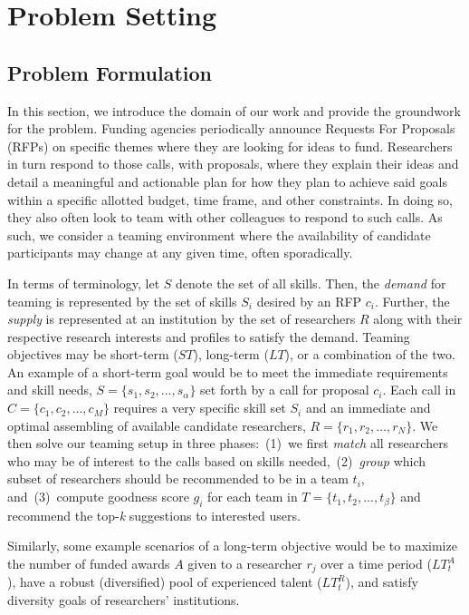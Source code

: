 \section{Problem Setting}

\subsection{Problem Formulation}

In this section, we introduce the domain of our work and provide the groundwork for the problem. Funding agencies periodically announce Requests For Proposals (RFPs) on specific themes where they are looking for ideas to fund. Researchers in turn respond to those calls, with proposals, where they explain their ideas and detail a meaningful and actionable plan for how they plan to achieve said goals within a specific allotted budget, time frame, and other constraints. In doing so, they also often look to team with other colleagues to respond to such calls. As such, we consider a teaming environment where the availability of candidate participants may change at any given time, often sporadically.

In terms of terminology, let $S$ denote the set of all skills. Then, the {\em demand} for teaming is represented by the set of skills $S_i$ desired by an RFP $c_i$. Further, the  {\em supply}  is represented at an institution by the set of researchers $R$ along with their respective research interests and profiles to satisfy the demand.  
Teaming objectives may be short-term ($ST$), long-term ($LT$), or a combination of the two. An example of a short-term goal would be to meet the immediate requirements and skill needs, $S=\{s_1, s_2, ..., s_\alpha\}$ set forth by a call for proposal $c_i$. Each call in $C=\{c_1, c_2, ..., c_M\}$ requires a very specific skill set $S_i$ and an immediate and optimal assembling of available candidate researchers, $R=\{r_1, r_2, ..., r_N\}$. We then solve our teaming setup in three phases:~(1)~we first \textit{match} all researchers who may be of interest to the calls based on skills needed,~(2)~\textit{group} which subset of researchers should be recommended to be in a team $t_i$, and~(3)~compute goodness score $g_i$ for each team in $T=\{t_1, t_2, ..., t_\beta\}$ and recommend the top-\textit{k} suggestions to interested users. 

Similarly, some example scenarios of a long-term objective would be to maximize the number of funded awards $A$ %
given to a researcher $r_j$ over a  time period (${LT}^A_t$), have a robust (diversified) pool of experienced talent ($LT^R_t$), and satisfy diversity goals of researchers' institutions.


